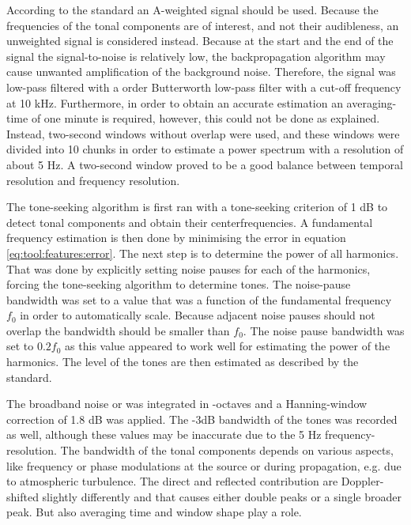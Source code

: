 According to the standard an A-weighted signal should be used. Because the
frequencies of the tonal components are of interest, and not their audibleness,
an unweighted signal is considered instead. Because at the start and the end of
the signal the signal-to-noise is relatively low, the backpropagation algorithm
may cause unwanted amplification of the background noise. Therefore, the signal
was low-pass filtered with a  order Butterworth low-pass filter with a
cut-off frequency at 10 kHz. Furthermore, in order to obtain an accurate
estimation an averaging-time of one minute is required, however, this could not
be done as explained. Instead, two-second windows without overlap were used, and
these windows were divided into 10 chunks in order to estimate a power spectrum
with a resolution of about 5 Hz. A two-second window proved to be a good balance
between temporal resolution and frequency resolution.

The tone-seeking algorithm is first ran with a tone-seeking criterion of 1 dB to
detect tonal components and obtain their centerfrequencies. A fundamental
frequency estimation is then done by minimising the error in equation
\eqref{eq:tool:features:error}. The next step is to determine the power of all
harmonics. That was done by explicitly setting noise pauses for each of the
harmonics, forcing the tone-seeking algorithm to determine tones.
The noise-pause bandwidth was set to a value that was a function of the fundamental
frequency $f_0$ in order to automatically scale. Because adjacent noise pauses
should not overlap the bandwidth should be smaller than $f_0$. The noise pause
bandwidth was set to $0.2 f_0$ as this value appeared to work well for
estimating the power of the  harmonics. The level of the tones are
then estimated as described by the standard.

The broadband noise or  was integrated in
-octaves and a Hanning-window correction of 1.8 dB was applied.
The -3dB bandwidth of the tones was recorded as well, although these values may
be inaccurate due to the 5 Hz frequency-resolution. The bandwidth of the tonal
components depends on various aspects, like frequency or phase modulations at
the source or during propagation, e.g. due to atmospheric turbulence. The direct
and reflected contribution are Doppler-shifted slightly differently and that
causes either double peaks or a single broader peak. But also averaging time and
window shape play a role.


